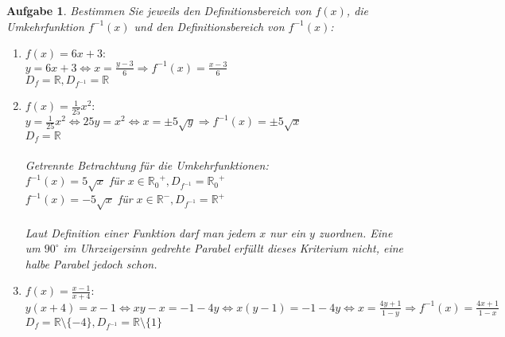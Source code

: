 \documentclass[12pt]{article}
\newtheorem{exercise}[satz]{Aufgabe}
\begin{document}
   \begin{exercise}
  Bestimmen Sie jeweils den Definitionsbereich von $f(x)$, die Umkehrfunktion $f^{-1}(x)$ und den Definitionsbereich von $f^{-1}(x)$:
  \begin{enumerate}
  \item[(a)] $f(x)=6x+3:$\\ 
             $y=6x+3 \Leftrightarrow x = \frac{y-3}{6} \Rightarrow f^{-1}(x) = \frac{x-3}{6}$\\
             $D_f = \mathbb{R}, D_{f^{-1}} = \mathbb{R}$
  \item[(b)] $f(x)=\frac{1}{25}x^2:$\\ 
             $y=\frac{1}{25}x^2 \Leftrightarrow 25y=x^2 \Leftrightarrow  x = \pm 5\sqrt{y} \Rightarrow f^{-1}(x) = \pm 5\sqrt{x}$\\
             $D_f = \mathbb{R}$\\
             \\
             Getrennte Betrachtung f\"ur die Umkehrfunktionen:\\
             $f^{-1}(x) = 5\sqrt{x}$ f\"ur $x\in {\mathbb{R}_0}^+, D_{f^{-1}} = {\mathbb{R}_0}^+$\\
             $f^{-1}(x) = -5\sqrt{x}$ f\"ur $x\in \mathbb{R}^-, D_{f^{-1}} = \mathbb{R}^+$\\
             \\
             Laut Definition einer Funktion darf man jedem $x$ nur ein $y$ zuordnen. Eine um $90^\circ$ im Uhrzeigersinn gedrehte Parabel erf\"ullt dieses Kriterium nicht, eine halbe Parabel jedoch schon.
  \item[(c)] $f(x)=\frac{x-1}{x+4}:$\\ 
             $y(x+4)=x-1 \Leftrightarrow xy-x=-1-4y \Leftrightarrow  x(y-1) = -1-4y \Leftrightarrow x=\frac{4y+1}{1-y}\Rightarrow f^{-1}(x) = \frac{4x+1}{1-x}$\\
             $D_f = \mathbb{R} \setminus \{-4\}, D_{f^{-1}} = \mathbb{R} \setminus \{1\}$
  \end{enumerate}
   \end{exercise}
\end{document}
